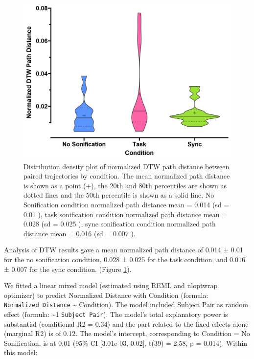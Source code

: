 \documentclass[10pt,a4paper,onecolumn]{article}
\begin{document}
\begin{figure}[h]

{\centering \includegraphics[width=1\linewidth]{figures/dtw_summary} 

}

\caption{Distribution density plot of normalized DTW path distance between paired trajectories by condition. The mean normalized path distance is shown as a point (+), the 20th and 80th percentiles are shown as dotted lines and the 50th percentile is shown as a solid line. No Sonification condition normalized path distance mean  =  0.014 (sd =  0.01 ), task sonification condition normalized path distance mean =  0.028 (sd =  0.025 ), sync sonification condition normalized path distance mean =  0.016 (sd =  0.007 ).}\label{fig:dtw-plot}
\end{figure}

Analysis of DTW results gave a mean normalized path distance of 0.014 ± 0.01 for the no sonification condition,
0.028 ± 0.025 for the task condition, and
0.016 ± 0.007 for the sync condition. (Figure \ref{fig:dtw-plot}).

We fitted a linear mixed model (estimated using REML and nloptwrap optimizer) to predict Normalized Distance with Condition (formula: \texttt{Normalized\ Distance} \textasciitilde{} Condition). The model included Subject Pair as random effect (formula: \textasciitilde1 \textbar{} \texttt{Subject\ Pair}). The model's total explanatory power is substantial (conditional R2 = 0.34) and the part related to the fixed effects alone (marginal R2) is of 0.12. The model's intercept, corresponding to Condition = No Sonification, is at 0.01 (95\% CI {[}3.01e-03, 0.02{]}, t(39) = 2.58, p = 0.014). Within this model:
\end{document}
